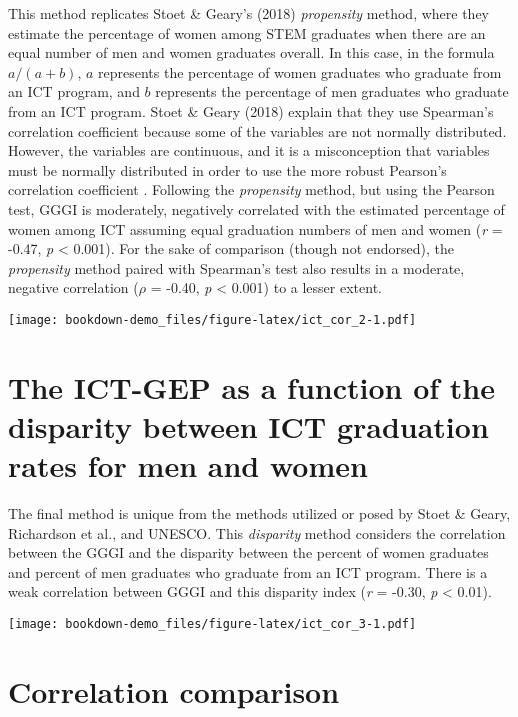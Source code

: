 \documentclass[]{book}
\begin{document}
This method replicates Stoet \& Geary's (2018) \emph{propensity} method,
where they estimate the percentage of women among STEM graduates when
there are an equal number of men and women graduates overall. In this
case, in the formula \(a/(a + b)\), \(a\) represents the percentage of
women graduates who graduate from an ICT program, and \(b\) represents
the percentage of men graduates who graduate from an ICT program. Stoet
\& Geary (2018) explain that they use Spearman's correlation coefficient
because some of the variables are not normally distributed. However, the
variables are continuous, and it is a misconception that variables must
be normally distributed in order to use the more robust Pearson's
correlation coefficient \citep{nefzgerNeedlessAssumptionNormality1957}.
Following the \emph{propensity} method, but using the Pearson test, GGGI
is moderately, negatively correlated with the estimated percentage of
women among ICT assuming equal graduation numbers of men and women
(\emph{r} = -0.47, \emph{p} \textless{} 0.001). For the sake of
comparison (though not endorsed), the \emph{propensity} method paired
with Spearman's test also results in a moderate, negative correlation
(\(\rho\) = -0.40, \emph{p} \textless{} 0.001) to a lesser extent.

\texttt{[image: bookdown-demo\_files/figure-latex/ict\_cor\_2-1.pdf]}

\section{The ICT-GEP as a function of the disparity between ICT
graduation rates for men and
women}\label{the-ict-gep-as-a-function-of-the-disparity-between-ict-graduation-rates-for-men-and-women}

The final method is unique from the methods utilized or posed by Stoet
\& Geary, Richardson et al., and UNESCO. This \emph{disparity} method
considers the correlation between the GGGI and the disparity between the
percent of women graduates and percent of men graduates who graduate
from an ICT program. There is a weak correlation between GGGI and this
disparity index (\emph{r} = -0.30, \emph{p} \textless{} 0.01).

\texttt{[image: bookdown-demo\_files/figure-latex/ict\_cor\_3-1.pdf]}

\section{Correlation comparison}\label{correlation-comparison}
\end{document}
